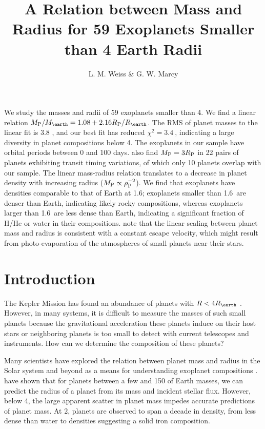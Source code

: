 \documentclass[11pt]{aastex}
\title{A Relation between Mass and Radius for 59 Exoplanets Smaller than 4 Earth Radii}
\author{L. M. Weiss \& G. W. Marcy}
\newcommand{\chisquared}{3.4~}
\newcommand{\rms}{3.8 \mearth}
\begin{document}
\maketitle
We study the masses and radii of 59 exoplanets smaller than 4\rearth.  We find a linear relation $\mpl/\mearth = 1.08 + 2.16\rpl/\rearth$.  The RMS of planet masses to the linear fit is \rms, and our best fit has reduced $\chi^2=\chisquared$, indicating a large diversity in planet compositions below 4\rearth.  The exoplanets in our sample have orbital periods between 0 and 100 days.  \citet{WL2013} also find $M_{\rm P} = 3R_{\rm P}$ in 22 pairs of planets exhibiting transit timing variations, of which only 10 planets overlap with our sample.  The linear mass-radius relation translates to a decrease in planet density with increasing radius ($M_{\rm P} \propto \rho_{\rm P}^{-2}$).  We find that exoplanets have densities comparable to that of Earth at 1.6\rearth; exoplanets smaller than 1.6\rearth\ are denser than Earth, indicating likely rocky compositions, whereas exoplanets larger than 1.6\rearth\ are less dense than Earth, indicating a significant fraction of H/He or water in their compositions. \citet{WL2013} note that the linear scaling between planet mass and radius is consistent with a constant escape velocity, which might result from photo-evaporation of the atmospheres of small planets near their stars.

\section{Introduction}

The Kepler Mission has found an abundance of planets with  $R < 4\rearth$ \citep{Batalha2013}.  However, in many systems, it is difficult to measure the masses of such small planets because the gravitational acceleration these planets induce on their host stars or neighboring planets is too small to detect with current telescopes and instruments.  How can we determine the composition of these planets?

Many scientists have explored the relation between planet mass and radius in the Solar system and beyond as a means for understanding exoplanet compositions \citep{Lissauer2011, Enoch2012, Kane2012, Seager2007}.  \citet{Weiss2013} have shown that for planets between a few and 150 of Earth masses, we can predict the radius of a planet from its mass and incident stellar flux.  However, below 4\rearth, the large apparent scatter in planet mass impedes accurate predictions of planet mass.  At 2\rearth, planets are observed to span a decade in density, from less dense than water to densities suggesting a solid iron composition.
\end{document}
